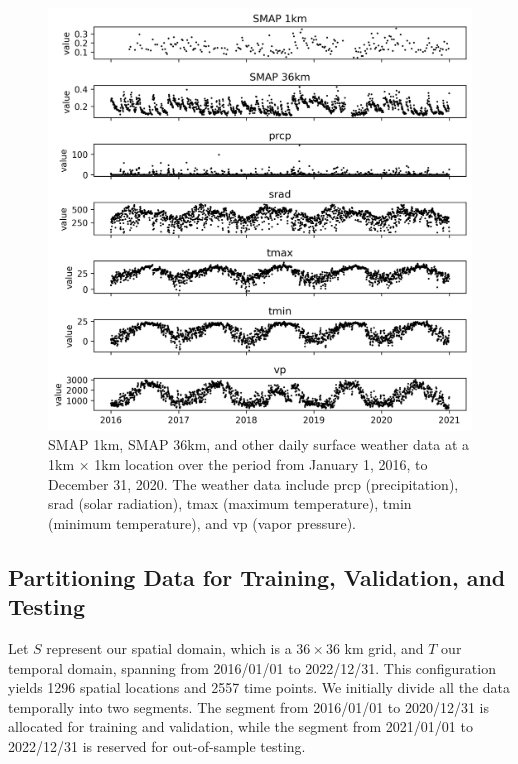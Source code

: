 \documentclass[review]{elsarticle}
\begin{document}
\begin{figure}[H]
\centering
\includegraphics[width=\textwidth]{figure/eda_time_varying.png}
\caption{SMAP 1km, SMAP 36km, and other daily surface weather data at a 1km × 1km location over the period from January 1, 2016, to December 31, 2020. The weather data include prcp (precipitation), srad (solar radiation), tmax (maximum temperature), tmin (minimum temperature), and vp (vapor pressure).}
\label{fig: eda_time_varying}
\end{figure}










\subsection{Partitioning Data for Training, Validation, and Testing}
Let $S$ represent our spatial domain, which is a \(36 \times 36\) km grid, and $T$ our temporal domain, spanning from 2016/01/01 to 2022/12/31.
This configuration yields 1296 spatial locations and 2557 time points. We initially divide all the data temporally into two segments. The segment from 2016/01/01 to 2020/12/31 is allocated for training and validation, while the segment from 2021/01/01 to 2022/12/31 is reserved for out-of-sample testing.
\end{document}
